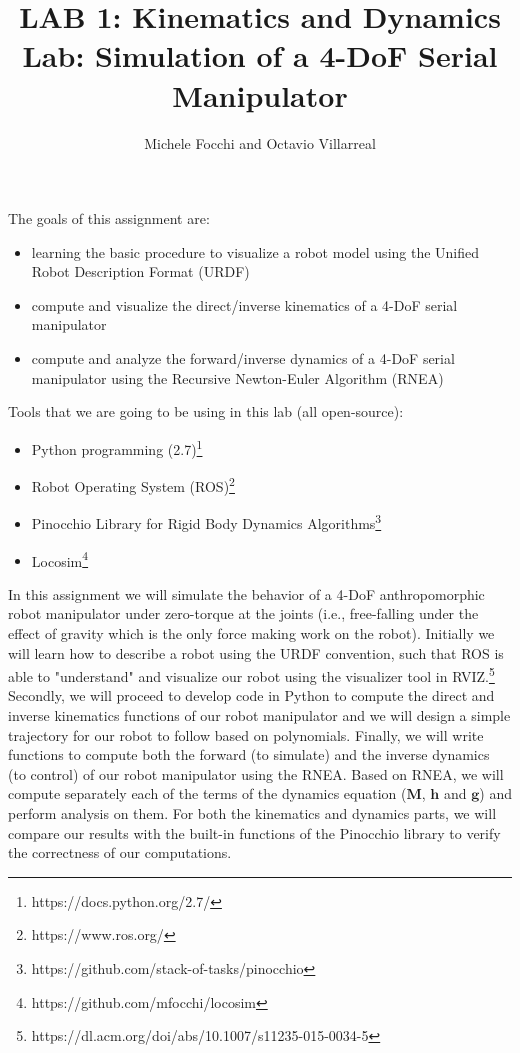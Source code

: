 \documentclass[11pt]{article}
\title{LAB 1: Kinematics and Dynamics Lab: Simulation of a 4-DoF Serial Manipulator}
\author{Michele Focchi and Octavio Villarreal}
\date{}
\begin{document}
\maketitle
\noindent
The goals of this assignment are:
\begin{itemize}
    \item learning the basic procedure to visualize a robot model using the Unified Robot Description Format (URDF)
    \item compute and visualize the direct/inverse kinematics of a 4-DoF serial manipulator 
    \item compute and analyze the forward/inverse dynamics of a 4-DoF serial manipulator using the Recursive Newton-Euler Algorithm (RNEA)
\end{itemize}

\noindent
Tools that we are going to be using in this lab (all open-source):
\begin{itemize}
	\item Python programming (2.7)\footnote{https://docs.python.org/2.7/}
	\item Robot Operating System (ROS)\footnote{https://www.ros.org/}
	\item Pinocchio Library for Rigid Body Dynamics Algorithms\footnote{https://github.com/stack-of-tasks/pinocchio}
	\item Locosim\footnote{https://github.com/mfocchi/locosim}
\end{itemize}
%
%
In this assignment we will simulate the behavior of a 4-DoF anthropomorphic robot manipulator under zero-torque at the joints (i.e., free-falling under the effect of gravity which is the only force making work on the robot). Initially we will learn how to describe a robot using the URDF convention, such that ROS is able to "understand" and visualize our robot using the visualizer tool in RVIZ.\footnote{https://dl.acm.org/doi/abs/10.1007/s11235-015-0034-5} Secondly, we will proceed to develop code in Python to compute the direct and inverse kinematics functions of  our robot manipulator and we will design a simple trajectory for our robot to follow based on polynomials. Finally, we will write functions to compute both the forward (to simulate) and the inverse dynamics (to control) of our robot manipulator using the RNEA.  Based on RNEA, we will compute separately each of the terms of the dynamics equation ($\mathbf{M}$, $\mathbf{h}$ and $\mathbf{g}$) and perform analysis on them. For both the kinematics and dynamics parts, we will compare our results with the built-in functions of the Pinocchio library to verify the correctness of our computations.
\end{document}
